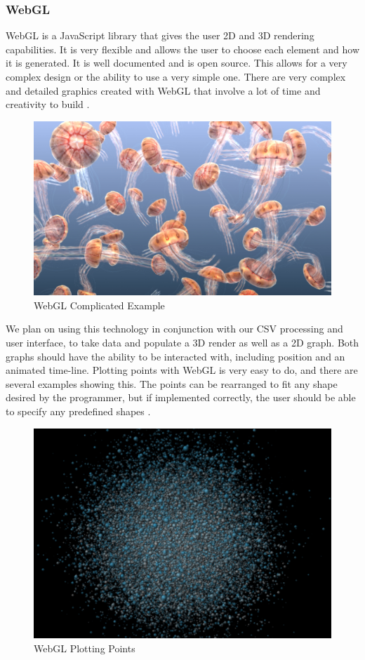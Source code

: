 \documentclass[journal,10pt,onecolumn,compsoc]{IEEEtran} \usepackage[margin=1.0in]{geometry} \usepackage{pdfpages}
\begin{document}
        \subsubsection{WebGL}
        WebGL is a JavaScript library that gives the user 2D and 3D rendering capabilities. It is very flexible and allows the user to choose each element and how it is generated. It is well documented and is open source. This allows for a very complex design or the ability to use a very simple one. There are very complex and detailed graphics created with WebGL that involve a lot of time and creativity to build \cite{Jellyfish}.
        \begin{figure}[H]
            \centering
                \caption{WebGL Complicated Example}
                \includegraphics[width=\linewidth]{webgl_example_1.jpg}
        \end{figure}
        We plan on using this technology in conjunction with our CSV processing and user interface, to take data and populate a 3D render as well as a 2D graph. Both graphs should have the ability to be interacted with, including position and an animated time-line. Plotting points with WebGL is very easy to do, and there are several examples showing this. The points can be rearranged to fit any shape desired by the programmer, but if implemented correctly, the user should be able to specify any predefined shapes \cite{Plots}.
        \begin{figure}[H]
            \centering
                \caption{WebGL Plotting Points}
                \includegraphics[width=\linewidth]{webgl_example_2.jpg}
        \end{figure}
\end{document}
